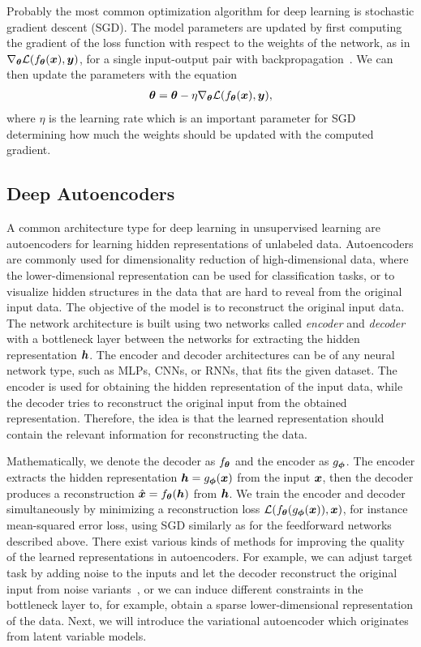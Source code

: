 Probably the most common optimization algorithm for deep learning is stochastic gradient descent (SGD). The model parameters are updated by first computing the gradient of the loss function with respect to the weights of the network, as in $\nabla_{{\bm{\theta}}} {\mathcal{L}}(f_{{\bm{\theta}}}({\bm{x}}), {\bm{y}})$, for a single input-output pair with backpropagation~\cite{rumelhart1986learning}. We can then update the parameters with the equation 
\begin{align}\label{eq:weight_update_sgd}
	{\bm{\theta}} = {\bm{\theta}} - \eta \nabla_{{\bm{\theta}}} {\mathcal{L}}(f_{{\bm{\theta}}}({\bm{x}}), {\bm{y}}),
\end{align} 
where $\eta$ is the learning rate which is an important parameter for SGD determining how much the weights should be updated with the computed gradient. 



\subsection{Deep Autoencoders}\label{sec:deep_autoencoders}

A common architecture type for deep learning in unsupervised learning are autoencoders for learning hidden representations of unlabeled data. Autoencoders are commonly used for dimensionality reduction of high-dimensional data, where the lower-dimensional representation can be used for classification tasks, or to visualize hidden structures in the data that are hard to reveal from the original input data. The objective of the model is to reconstruct the original input data. The network architecture is built using two networks called \textit{encoder} and \textit{decoder} with a bottleneck layer between the networks for extracting the hidden representation ${\bm{h}}$. The encoder and decoder architectures can be of any neural network type, such as MLPs, CNNs, or RNNs, that fits the given dataset. The encoder is used for obtaining the hidden representation of the input data, while the decoder tries to reconstruct the original input from the obtained representation. Therefore, the idea is that the learned representation should contain the relevant information for reconstructing the data. 

Mathematically, we denote the decoder as $f_{{\bm{\theta}}}$ and the encoder as $g_{{\bm{\phi}}}$. The encoder extracts the hidden representation ${\bm{h}} = g_{{\bm{\phi}}}({\bm{x}})$ from the input ${\bm{x}}$, then the decoder produces a reconstruction $\hat{{\bm{x}}} = f_{{\bm{\theta}}}({\bm{h}})$ from ${\bm{h}}$. We train the encoder and decoder simultaneously by minimizing a reconstruction loss ${\mathcal{L}}(f_{{\bm{\theta}}}(g_{{\bm{\phi}}}({\bm{x}})), {\bm{x}})$, for instance mean-squared error loss, using SGD similarly as for the feedforward networks described above. There exist various kinds of methods for improving the quality of the learned representations in autoencoders. For example, we can adjust target task by adding noise to the inputs and let the decoder reconstruct the original input from noise variants~\cite{vincent2008extracting}, or we can induce different constraints in the bottleneck layer to, for example, obtain a sparse lower-dimensional representation of the data. Next, we will introduce the variational autoencoder which originates from latent variable models. 

